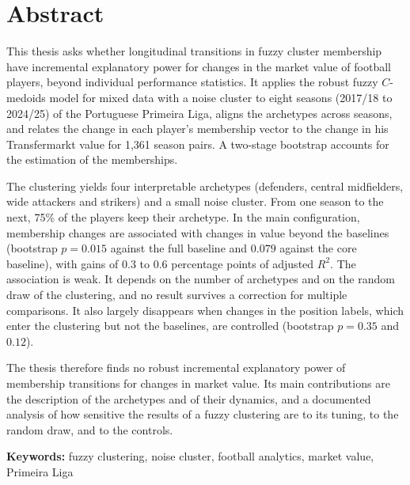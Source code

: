 \chapter*{Abstract}

This thesis asks whether longitudinal transitions in fuzzy cluster membership have incremental explanatory power for changes in the market value of football players, beyond individual performance statistics. It applies the robust fuzzy $C$-medoids model for mixed data with a noise cluster to eight seasons (2017/18 to 2024/25) of the Portuguese Primeira Liga, aligns the archetypes across seasons, and relates the change in each player's membership vector to the change in his Transfermarkt value for 1,361 season pairs. A two-stage bootstrap accounts for the estimation of the memberships.

The clustering yields four interpretable archetypes (defenders, central midfielders, wide attackers and strikers) and a small noise cluster. From one season to the next, 75\% of the players keep their archetype. In the main configuration, membership changes are associated with changes in value beyond the baselines (bootstrap $p=0.015$ against the full baseline and $0.079$ against the core baseline), with gains of 0.3 to 0.6 percentage points of adjusted $R^2$. The association is weak. It depends on the number of archetypes and on the random draw of the clustering, and no result survives a correction for multiple comparisons. It also largely disappears when changes in the position labels, which enter the clustering but not the baselines, are controlled (bootstrap $p=0.35$ and $0.12$).

The thesis therefore finds no robust incremental explanatory power of membership transitions for changes in market value. Its main contributions are the description of the archetypes and of their dynamics, and a documented analysis of how sensitive the results of a fuzzy clustering are to its tuning, to the random draw, and to the controls.

\bigskip\noindent\textbf{Keywords:} fuzzy clustering, noise cluster, football analytics, market value, Primeira Liga
\clearpage

